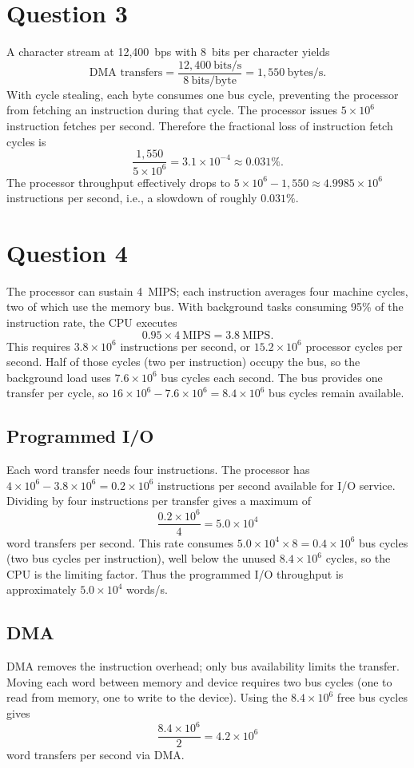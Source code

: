 \documentclass[12pt]{article}
\begin{document}
\section*{Question 3}
A character stream at 12{,}400~bps with 8~bits per character yields
\[
\text{DMA transfers} = \frac{12{,}400~\text{bits/s}}{8~\text{bits/byte}} = 1{,}550~\text{bytes/s}.
\]
With cycle stealing, each byte consumes one bus cycle, preventing the processor from fetching an instruction during that cycle. The processor issues $5\times10^{6}$ instruction fetches per second. Therefore the fractional loss of instruction fetch cycles is
\[
\frac{1{,}550}{5\times10^{6}} = 3.1\times 10^{-4} \approx 0.031\%.
\]
The processor throughput effectively drops to $5\times10^{6} - 1{,}550 \approx 4.9985\times10^{6}$ instructions per second, i.e., a slowdown of roughly $0.031\%$.

\section*{Question 4}
The processor can sustain 4~MIPS; each instruction averages four machine cycles, two of which use the memory bus. With background tasks consuming 95\% of the instruction rate, the CPU executes
\[
0.95 \times 4~\text{MIPS} = 3.8~\text{MIPS}.
\]
This requires $3.8\times 10^{6}$ instructions per second, or $15.2\times 10^{6}$ processor cycles per second. Half of those cycles (two per instruction) occupy the bus, so the background load uses $7.6\times 10^{6}$ bus cycles each second. The bus provides one transfer per cycle, so $16\times 10^{6} - 7.6\times 10^{6} = 8.4\times 10^{6}$ bus cycles remain available.

\subsection*{Programmed I/O}
Each word transfer needs four instructions. The processor has $4\times10^{6} - 3.8\times10^{6} = 0.2\times10^{6}$ instructions per second available for I/O service. Dividing by four instructions per transfer gives a maximum of
\[
\frac{0.2\times10^{6}}{4} = 5.0\times10^{4}
\]
word transfers per second. This rate consumes $5.0\times10^{4} \times 8 = 0.4\times10^{6}$ bus cycles (two bus cycles per instruction), well below the unused $8.4\times10^{6}$ cycles, so the CPU is the limiting factor. Thus the programmed I/O throughput is approximately $5.0\times10^{4}$ words/s.

\subsection*{DMA}
DMA removes the instruction overhead; only bus availability limits the transfer. Moving each word between memory and device requires two bus cycles (one to read from memory, one to write to the device). Using the $8.4\times10^{6}$ free bus cycles gives
\[
\frac{8.4\times10^{6}}{2} = 4.2\times10^{6}
\]
word transfers per second via DMA.
\end{document}
